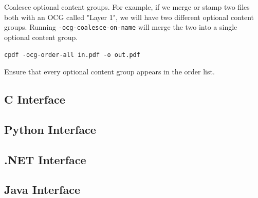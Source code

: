 \documentclass{book}
\begin{document}
\noindent Coalesce optional content groups. For example, if we merge or stamp two files both with an OCG called "Layer 1", we will have two different optional content groups. Running \texttt{-ocg-coalesce-on-name} will merge the two into a single optional content group.

  {\small\begin{framed}
  \noindent\verb!cpdf -ocg-order-all in.pdf -o out.pdf!
  \end{framed}}

\noindent Ensure that every optional content group appears in the order list.

\begin{cpdflib}
\clearpage
\section*{C Interface}
\begin{small}\tt

\end{small}
\end{cpdflib}

\begin{pycpdflib}
\clearpage
\section*{Python Interface}
\begin{small}\tt

\end{small}
\end{pycpdflib}

\begin{dotnetcpdflib}
\clearpage
\section*{.NET Interface}
\begin{small}\tt

\end{small}
\end{dotnetcpdflib}

\begin{jcpdflib}
\clearpage
\section*{Java Interface}
\begin{small}\tt

\end{small}
\end{jcpdflib}
\end{document}
